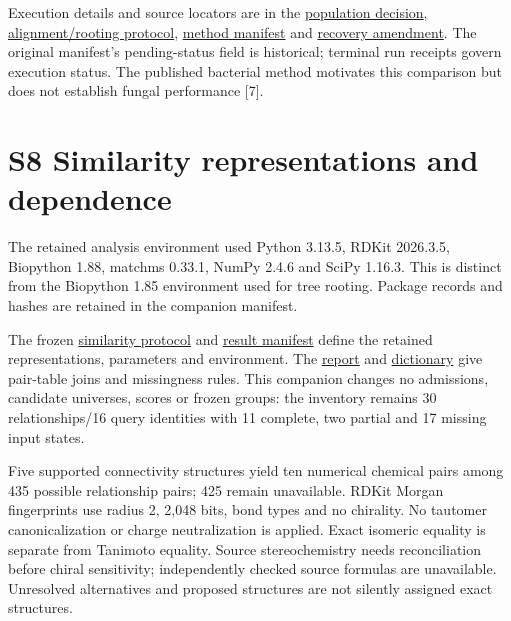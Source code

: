 \documentclass[
  10pt,
  a4paper,
]{article}
\begin{document}
Execution details and source locators are in the \href{https://github.com/vinvomero/fungallink-benchmark/blob/main/protocol/decisions/2026-10-07-phylogeny-comparison-population.md}{population decision}, \href{https://github.com/vinvomero/fungallink-benchmark/blob/main/protocol/decisions/2026-10-07-phylogeny-alignment-rooting.md}{alignment/rooting protocol}, \href{https://github.com/vinvomero/fungallink-benchmark/blob/main/data/manifests/phylogeny-method.json}{method manifest} and \href{https://github.com/vinvomero/fungallink-benchmark/blob/main/protocol/decisions/2026-10-11-phylogeny-optimizer-recovery.md}{recovery amendment}. The original manifest's pending-status field is historical; terminal run receipts govern execution status. The published bacterial method motivates this comparison but does not establish fungal performance {[}7{]}.

\section{S8 Similarity representations and dependence}\label{s8-similarity-representations-and-dependence}

The retained analysis environment used Python 3.13.5, RDKit 2026.3.5, Biopython 1.88, matchms 0.33.1, NumPy 2.4.6 and SciPy 1.16.3. This is distinct from the Biopython 1.85 environment used for tree rooting. Package records and hashes are retained in the companion manifest.

The frozen \href{https://github.com/vinvomero/fungallink-benchmark/blob/main/protocol/similarity-independence-v1.md}{similarity protocol} and \href{https://github.com/vinvomero/fungallink-benchmark/blob/main/data/processed/similarity-independence-v1/manifest.json}{result manifest} define the retained representations, parameters and environment. The \href{https://github.com/vinvomero/fungallink-benchmark/blob/main/docs/evaluation/similarity-independence-v1.md}{report} and \href{https://github.com/vinvomero/fungallink-benchmark/blob/main/docs/release/similarity-independence-v1.md}{dictionary} give pair-table joins and missingness rules. This companion changes no admissions, candidate universes, scores or frozen groups: the inventory remains 30 relationships/16 query identities with 11 complete, two partial and 17 missing input states.

Five supported connectivity structures yield ten numerical chemical pairs among 435 possible relationship pairs; 425 remain unavailable. RDKit Morgan fingerprints use radius 2, 2,048 bits, bond types and no chirality. No tautomer canonicalization or charge neutralization is applied. Exact isomeric equality is separate from Tanimoto equality. Source stereochemistry needs reconciliation before chiral sensitivity; independently checked source formulas are unavailable. Unresolved alternatives and proposed structures are not silently assigned exact structures.
\end{document}
